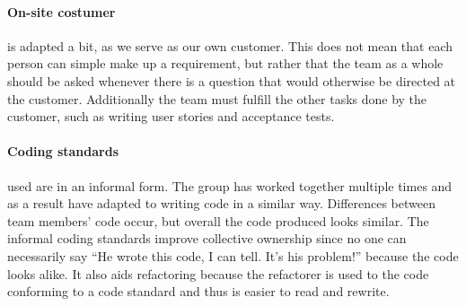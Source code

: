 \paragraph{On-site costumer} is adapted a bit, as we serve as our own customer. This does not mean that each person can simple make up a requirement, but rather that the team as a whole should be asked whenever there is a question that would otherwise be directed at the customer. Additionally the team must fulfill the other tasks done by the customer, such as writing user stories and acceptance tests.

\paragraph{Coding standards} used are in an informal form. The group has worked together multiple times and as a result have adapted to writing code in a similar way. Differences between team members' code occur, but overall the code produced looks similar. The informal coding standards improve collective ownership since no one can necessarily say ``He wrote this code, I can tell. It's his problem!'' because the code looks alike. It also aids refactoring because the refactorer is used to the code conforming to a code standard and thus is easier to read and rewrite.

